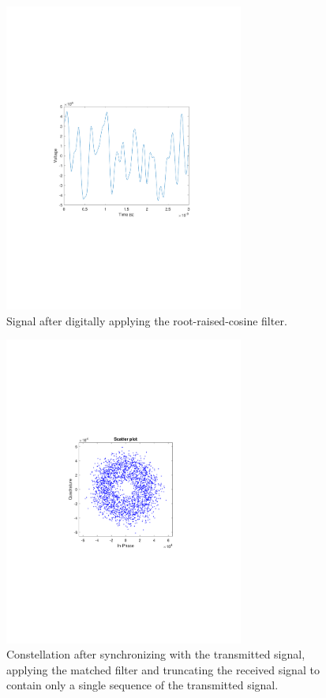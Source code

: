 \begin{refsection}
\begin{figure}[H]
\centering
\includegraphics[clip, trim=4cm 8cm 4cm 8cm, width=0.7\textwidth]{./sdf/m_qam_system/figures/exp/MF_03.pdf}
\caption{Signal after digitally applying the root-raised-cosine filter.}
\label{fig:qamMfSig}
\end{figure}

\begin{figure}[H]
	\centering
	\includegraphics[clip, trim=4cm 8cm 4cm 8cm, width=0.7\textwidth]{./sdf/m_qam_system/figures/exp/const-synMF-sps.pdf}
	\caption{Constellation after synchronizing with the transmitted signal, applying the matched filter and truncating the received signal to contain only a single sequence of the transmitted signal.}
	\label{fig:rxMfSync}
\end{figure}


\end{refsection}
